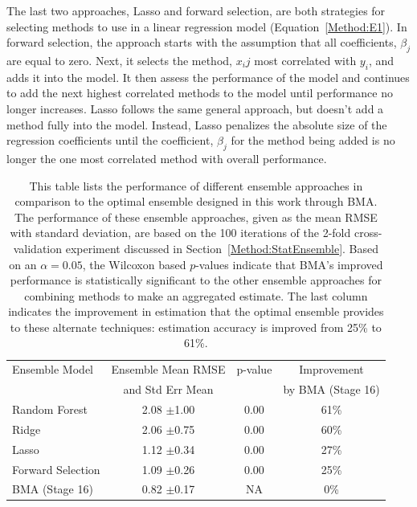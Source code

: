 \documentclass[journal=jpcbfk, manuscript=article]{achemso}
\newcommand{\+}[1]{\ensuremath{\mathbf{#1}}}
\begin{document}
The last two approaches, Lasso and forward selection, are both strategies for selecting methods to use in a linear regression model (Equation~\ref{Method:E1}). 
In forward selection, the approach starts with the assumption that all coefficients, $\beta_j$ are equal to zero.
Next, it selects the method, $x_ij$ most correlated with $y_i$, and adds it into the model. 
It then assess the performance of the model and continues to add the next highest correlated methods to the model until performance no longer increases.
Lasso follows the same general approach, but doesn't add a method fully into the model.
Instead, Lasso penalizes the absolute size of the regression coefficients until the coefficient, $\beta_j$ for the method being added is no longer the one most correlated method with overall performance.


\begin{table}[t!]
	\centering
	\caption[Model comparison with mean RMSE]{This table lists the performance of different ensemble approaches in comparison to the optimal ensemble designed in this work through BMA.
	The performance of these ensemble approaches, given as the mean RMSE with standard deviation, are based on the 100 iterations of the 2-fold cross-validation experiment discussed in Section~\ref{Method:StatEnsemble}.
	Based on an $\alpha = 0.05$, the Wilcoxon based $p$-values indicate that BMA's improved performance is statistically significant to the other ensemble approaches for combining methods to make an aggregated estimate.
	The last column indicates the improvement in estimation that the optimal ensemble provides to these alternate techniques: estimation accuracy is improved from 25\% to 61\%. }
	\footnotesize
	\begin{tabular}{lccc}
		\hline
		\hline
		Ensemble Model  & Ensemble Mean RMSE  & p-value & Improvement\\
		 & and Std Err Mean& & by BMA (Stage 16)\\
		\hline
		Random Forest & 2.08 $\pm$1.00 & 0.00 & 61\%\\
		Ridge & 2.06 $\pm$0.75 & 0.00 & 60\%\\
		Lasso & 1.12 $\pm$0.34 & 0.00 & 27\%\\
		Forward Selection & 1.09 $\pm$0.26 & 0.00 &  25\%\\		
		BMA (Stage 16) & 0.82 $\pm$0.17 & NA & 0\%\\
		\hline
		\hline
	\end{tabular}
	\label{Analysis:Table4:EnsembleCompare}
\end{table}
\end{document}
